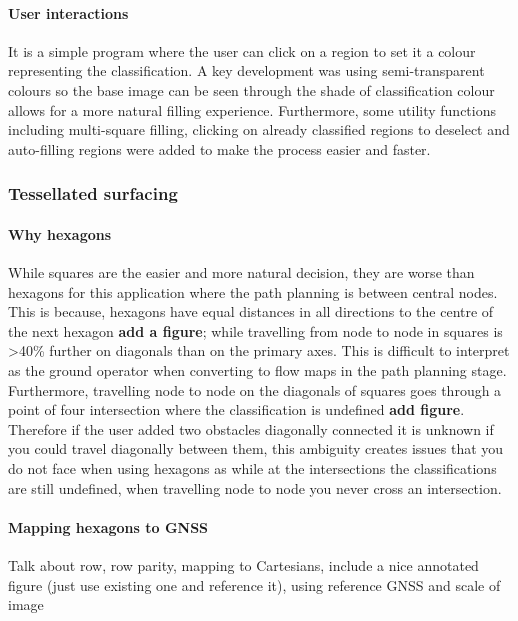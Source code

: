\paragraph{User interactions}
It is a simple program where the user can click on a region to set it a colour representing the classification. A key development was using semi-transparent colours so the base image can be seen through the shade of classification colour allows for a more natural filling experience. Furthermore, some utility functions including multi-square filling, clicking on already classified regions to deselect and auto-filling regions were added to make the process easier and faster.

\subsubsection{Tessellated surfacing}
\paragraph{Why hexagons} While squares are the easier and more natural decision, they are worse than hexagons for this application where the path planning is between central nodes. This is because, hexagons have equal distances in all directions to the centre of the next hexagon \textbf{add a figure}; while travelling from node to node in squares is >40\% further on diagonals than on the primary axes. This is difficult to interpret as the ground operator when converting to flow maps in the path planning stage. Furthermore, travelling node to node on the diagonals of squares goes through a point of four intersection where the classification is undefined \textbf{add figure}. Therefore if the user added two obstacles diagonally connected it is unknown if you could travel diagonally between them, this ambiguity creates issues that you do not face when using hexagons as while at the intersections the classifications are still undefined, when travelling node to node you never cross an intersection.

\paragraph{Mapping hexagons to \gls{GNSS}}
Talk about row, row parity, mapping to Cartesians, include a nice annotated figure (just use existing one and reference it), using reference GNSS and scale of image